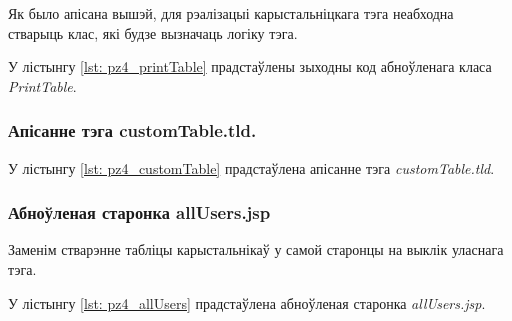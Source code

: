 Як было апісана вышэй, для рэалізацыі карыстальніцкага тэга неабходна
стварыць клас, які будзе вызначаць логіку тэга.

У лістынгу \ref{lst: pz4_printTable} прадстаўлены зыходны код абноўленага класа \textit{PrintTable}.



\subsubsection{Апісанне тэга customTable.tld.}

У лістынгу \ref{lst: pz4_customTable} прадстаўлена апісанне тэга \textit{customTable.tld}.



\subsubsection{Абноўленая старонка allUsers.jsp}

Заменім стварэнне табліцы карыстальнікаў у самой старонцы
на выклік уласнага тэга.


У лістынгу \ref{lst: pz4_allUsers} прадстаўлена абноўленая старонка \textit{allUsers.jsp}.


